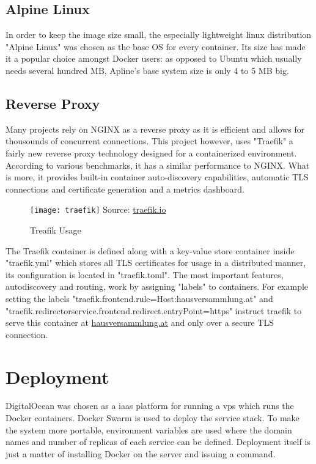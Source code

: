 \subsection{Alpine Linux}
In order to keep the image size small, the especially lightweight linux distribution "Alpine Linux" was chosen as the base OS for every container. Its size has made it a popular choice amongst Docker users: as opposed to Ubuntu which usually needs several hundred MB, Apline's base system size is only 4 to 5 MB big.

\subsection{Reverse Proxy}
Many projects rely on NGINX as a reverse proxy as it is efficient and allows for thousounds of concurrent connections. This project however, uses "Traefik" a fairly new reverse proxy technology designed for a containerized environment. According to various benchmarks, it has a similar performance to NGINX. What is more, it provides built-in container auto-discovery capabilities, automatic TLS connections and certificate generation and a metrics dashboard.

\begin{figure}[H]
    \begin{center}
    \texttt{[image: traefik]}
    Source: \href{https://traefik.io/}{traefik.io}
    \end{center}
    \caption{Treafik Usage}
    \label{fig:traefik}
\end{figure}

The Traefik container is defined along with a key-value store container inside "traefik.yml" which stores all TLS certificates for usage in a distributed manner, its configuration is located in "traefik.toml". The most important features, autodiscovery and routing, work by assigning "labels" to containers. For example setting the labels "traefik.frontend.rule=Host:hausversammlung.at" and "traefik.redirectorservice.frontend.redirect.entryPoint=https" instruct traefik to serve this container at \url{hausversammlung.at} and only over a secure TLS connection.

\section{Deployment}
DigitalOcean was chosen as a \acrfull{iaas} platform for running a \acrfull{vps} which runs the Docker containers. Docker Swarm is used to deploy the service stack. To make the system more portable, environment variables are used where the domain names and number of replicas of each service can be defined. Deployment itself is just a matter of installing Docker on the server and issuing a command.